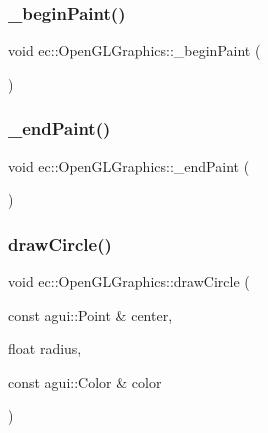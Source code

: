 \subsubsection{\texorpdfstring{\+\_\+begin\+Paint()}{\_beginPaint()}}
{\footnotesize\ttfamily void ec\+::\+Open\+G\+L\+Graphics\+::\+\_\+begin\+Paint (\begin{DoxyParamCaption}{ }\end{DoxyParamCaption})\hspace{0.3cm}{\ttfamily [override]}}

\mbox{\label{classec_1_1_open_g_l_graphics_aca816c9b6aecd0f36aa6d1c0cb7b82b6}} 
\subsubsection{\texorpdfstring{\+\_\+end\+Paint()}{\_endPaint()}}
{\footnotesize\ttfamily void ec\+::\+Open\+G\+L\+Graphics\+::\+\_\+end\+Paint (\begin{DoxyParamCaption}{ }\end{DoxyParamCaption})\hspace{0.3cm}{\ttfamily [override]}}

\mbox{\label{classec_1_1_open_g_l_graphics_aeccf106f9e5f5da14db66d39595fc6e9}} 
\subsubsection{\texorpdfstring{draw\+Circle()}{drawCircle()}}
{\footnotesize\ttfamily void ec\+::\+Open\+G\+L\+Graphics\+::draw\+Circle (\begin{DoxyParamCaption}\item[{const agui\+::\+Point \&}]{center,  }\item[{float}]{radius,  }\item[{const agui\+::\+Color \&}]{color }\end{DoxyParamCaption})\hspace{0.3cm}{\ttfamily [override]}}

